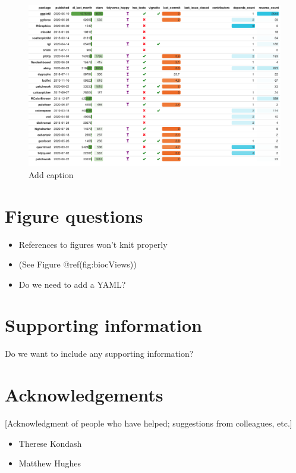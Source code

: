 \documentclass[10pt,letterpaper]{article}
\providecommand{\tightlist}{%
  \setlength{\itemsep}{0pt}\setlength{\parskip}{0pt}}
\begin{document}
\begin{figure}
\includegraphics[width=1\linewidth]{../figures/packagemetrics} \caption{Add caption}\label{fig:packagemetrics}
\end{figure}

\hypertarget{figure-questions}{%
\section{Figure questions}\label{figure-questions}}

\begin{itemize}
\tightlist
\item
  References to figures won't knit properly
\item
  (See Figure @ref(fig:biocViews))
\item
  Do we need to add a YAML?
\end{itemize}

\hypertarget{supporting-information}{%
\section{Supporting information}\label{supporting-information}}

Do we want to include any supporting information?

\hypertarget{acknowledgements}{%
\section{Acknowledgements}\label{acknowledgements}}

{[}Acknowledgment of people who have helped; suggestions from
colleagues, etc.{]}

\begin{itemize}
\tightlist
\item
  Therese Kondash
\item
  Matthew Hughes
\end{itemize}
\end{document}
